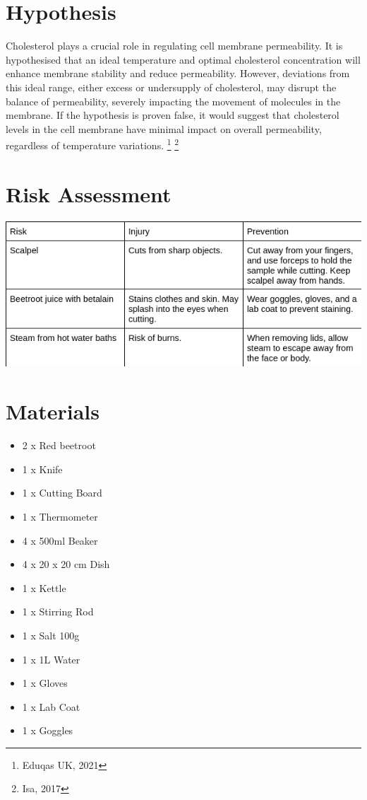 \documentclass[a4paper,12pt,twoside,english]{all-in-one} %
\begin{document}
\section{Hypothesis}
\begin{theorem}
Cholesterol plays a crucial role in regulating cell membrane permeability. It is hypothesised that an ideal temperature and optimal cholesterol concentration will enhance membrane stability and reduce permeability. However, deviations from this ideal range, either excess or undersupply of cholesterol, may disrupt the balance of permeability, severely impacting the movement of molecules in the membrane. If the hypothesis is proven false, it would suggest that cholesterol levels in the cell membrane have minimal impact on overall permeability, regardless of temperature variations. \footnote{Eduqas UK, 2021} \footnote{Isa, 2017}
\end{theorem}

\section{Risk Assessment}
\includegraphics[scale=0.8]{images/risk_table.png}

\section{Materials}
\begin{itemize}
    \item 2 x Red beetroot
    \item 1 x Knife
    \item 1 x Cutting Board
    \item 1 x Thermometer
    \item 4 x 500ml Beaker
    \item 4 x 20 x 20 cm Dish
    \item 1 x Kettle
    \item 1 x Stirring Rod
    \item 1 x Salt 100g
    \item 1 x 1L Water
    \item 1 x Gloves
    \item 1 x Lab Coat
    \item 1 x Goggles
\end{itemize}
\end{document}
